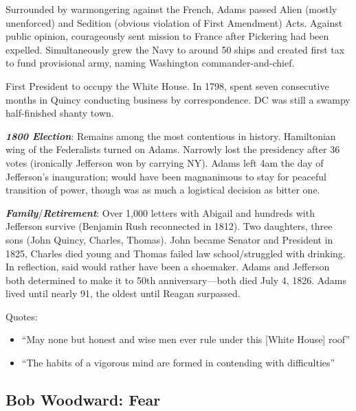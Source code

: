 \documentclass[
]{article}
\begin{document}
Surrounded by warmongering against the French, Adams passed Alien
(mostly unenforced) and Sedition (obvious violation of First Amendment)
Acts. Against public opinion, courageously sent mission to France after
Pickering had been expelled. Simultaneously grew the Navy to around 50
ships and created first tax to fund provisional army, naming Washington
commander-and-chief.

First President to occupy the White House. In 1798, spent seven
consecutive months in Quincy conducting business by correspondence. DC
was still a swampy half-finished shanty town.

\textbf{\emph{1800 Election}}: Remains among the most contentious in
history. Hamiltonian wing of the Federalists turned on Adams. Narrowly
lost the presidency after 36 votes (ironically Jefferson won by carrying
NY). Adams left 4am the day of Jefferson's inauguration; would have been
magnanimous to stay for peaceful transition of power, though was as much
a logistical decision as bitter one.

\textbf{\emph{Family}}/\textbf{\emph{Retirement}}: Over 1,000 letters
with Abigail and hundreds with Jefferson survive (Benjamin Rush
reconnected in 1812). Two daughters, three sons (John Quincy, Charles,
Thomas). John became Senator and President in 1825, Charles died young
and Thomas failed law school/struggled with drinking. In reflection,
said would rather have been a shoemaker. Adams and Jefferson both
determined to make it to 50th anniversary---both died July 4, 1826.
Adams lived until nearly 91, the oldest until Reagan surpassed.

Quotes:

\begin{itemize}
\item
  ``May none but honest and wise men ever rule under this {[}White
  House{]} roof''
\item
  ``The habits of a vigorous mind are formed in contending with
  difficulties''
\end{itemize}

\hypertarget{bob-woodward-fear}{%
\subsection{Bob Woodward: Fear}\label{bob-woodward-fear}}
\end{document}
